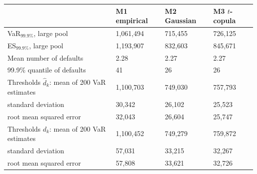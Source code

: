 \begin{tabular}{llll}
\toprule
 & M1 empirical & M2 Gaussian & M3 $t$-copula \\
\midrule
VaR$_{99.9\%}$, large pool & 1,061,494 & 715,455 & 726,125 \\
ES$_{99.9\%}$, large pool & 1,193,907 & 832,603 & 845,671 \\
Mean number of defaults & 2.28 & 2.27 & 2.27 \\
99.9\% quantile of defaults & 41 & 26 & 26 \\
Thresholds $\hat d_k$: mean of 200 VaR estimates & 1,100,703 & 749,030 & 757,793 \\
\quad standard deviation & 30,342 & 26,102 & 25,523 \\
\quad root mean squared error & 32,043 & 26,604 & 25,747 \\
Thresholds $d_k$: mean of 200 VaR estimates & 1,100,452 & 749,279 & 759,872 \\
\quad standard deviation & 57,031 & 33,215 & 32,267 \\
\quad root mean squared error & 57,808 & 33,621 & 32,726 \\
\bottomrule
\end{tabular}
